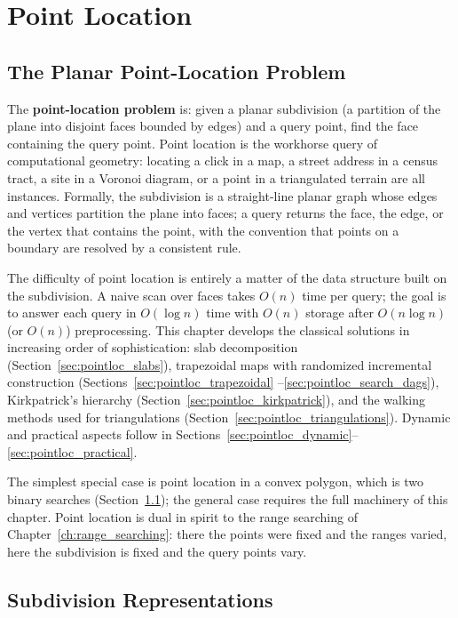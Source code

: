 \chapter{Point Location}
\label{ch:point_location}

\section{The Planar Point-Location Problem}
\label{sec:pointloc_problem}

The \textbf{point-location problem} is: given a
planar subdivision (a partition of the plane into disjoint faces bounded by
edges) and a query point, find the face containing the query point. Point
location is the workhorse query of computational geometry: locating a
click in a map, a street address in a census tract, a site in a Voronoi
diagram, or a point in a triangulated terrain are all instances. Formally,
the subdivision is a straight-line planar graph whose edges and vertices
partition the plane into faces; a query returns the face, the edge, or the
vertex that contains the point, with the convention that points on a
boundary are resolved by a consistent rule.

The difficulty of point location is entirely a matter of the data
structure built on the subdivision. A naive scan over faces takes $O(n)$
time per query; the goal is to answer each query in $O(\log n)$ time with
$O(n)$ storage after $O(n \log n)$ (or $O(n)$) preprocessing. This chapter
develops the classical solutions in increasing order of sophistication:
slab decomposition (Section~\ref{sec:pointloc_slabs}), trapezoidal maps
with randomized incremental construction (Sections~\ref{sec:pointloc_trapezoidal}
--\ref{sec:pointloc_search_dags}), Kirkpatrick's hierarchy
(Section~\ref{sec:pointloc_kirkpatrick}), and the walking methods used for
triangulations (Section~\ref{sec:pointloc_triangulations}). Dynamic and
practical aspects follow in Sections~\ref{sec:pointloc_dynamic}--\ref{sec:pointloc_practical}.

The simplest special case is point location in a convex polygon, which is
two binary searches (Section~\ref{sec:pointloc_problem}); the general case
requires the full machinery of this chapter. Point location is dual in
spirit to the range searching of Chapter~\ref{ch:range_searching}: there
the points were fixed and the ranges varied, here the subdivision is fixed
and the query points vary.

\section{Subdivision Representations}
\label{sec:pointloc_subdivisions}

